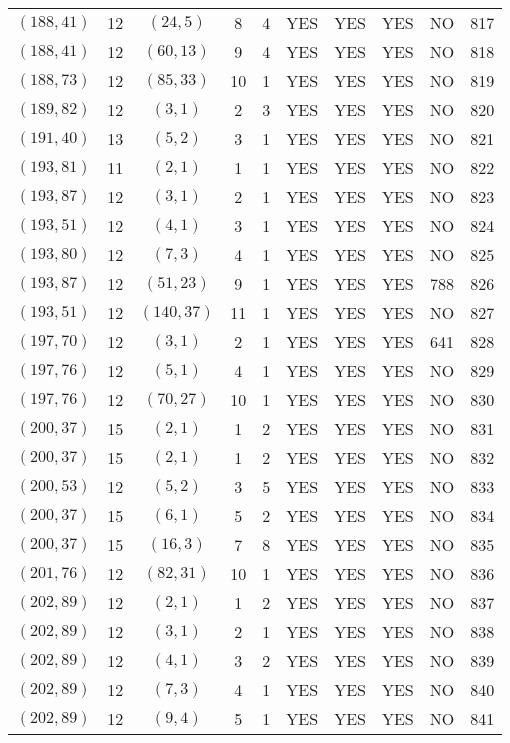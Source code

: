 \begin{longtable}{|c|c|c|c|c|c|c|c|c|c|}
$(188, 41)$ & 12 & $(24, 5)$ & 8 & 4 & YES & YES & YES & NO & 817\\
$(188, 41)$ & 12 & $(60, 13)$ & 9 & 4 & YES & YES & YES & NO & 818\\
$(188, 73)$ & 12 & $(85, 33)$ & 10 & 1 & YES & YES & YES & NO & 819\\
$(189, 82)$ & 12 & $(3, 1)$ & 2 & 3 & YES & YES & YES & NO & 820\\
$(191, 40)$ & 13 & $(5, 2)$ & 3 & 1 & YES & YES & YES & NO & 821\\
$(193, 81)$ & 11 & $(2, 1)$ & 1 & 1 & YES & YES & YES & NO & 822\\
$(193, 87)$ & 12 & $(3, 1)$ & 2 & 1 & YES & YES & YES & NO & 823\\
$(193, 51)$ & 12 & $(4, 1)$ & 3 & 1 & YES & YES & YES & NO & 824\\
$(193, 80)$ & 12 & $(7, 3)$ & 4 & 1 & YES & YES & YES & NO & 825\\
$(193, 87)$ & 12 & $(51, 23)$ & 9 & 1 & YES & YES & YES & 788 & 826\\
$(193, 51)$ & 12 & $(140, 37)$ & 11 & 1 & YES & YES & YES & NO & 827\\
$(197, 70)$ & 12 & $(3, 1)$ & 2 & 1 & YES & YES & YES & 641 & 828\\
$(197, 76)$ & 12 & $(5, 1)$ & 4 & 1 & YES & YES & YES & NO & 829\\
$(197, 76)$ & 12 & $(70, 27)$ & 10 & 1 & YES & YES & YES & NO & 830\\
$(200, 37)$ & 15 & $(2, 1)$ & 1 & 2 & YES & YES & YES & NO & 831\\
$(200, 37)$ & 15 & $(2, 1)$ & 1 & 2 & YES & YES & YES & NO & 832\\
$(200, 53)$ & 12 & $(5, 2)$ & 3 & 5 & YES & YES & YES & NO & 833\\
$(200, 37)$ & 15 & $(6, 1)$ & 5 & 2 & YES & YES & YES & NO & 834\\
$(200, 37)$ & 15 & $(16, 3)$ & 7 & 8 & YES & YES & YES & NO & 835\\
$(201, 76)$ & 12 & $(82, 31)$ & 10 & 1 & YES & YES & YES & NO & 836\\
$(202, 89)$ & 12 & $(2, 1)$ & 1 & 2 & YES & YES & YES & NO & 837\\
$(202, 89)$ & 12 & $(3, 1)$ & 2 & 1 & YES & YES & YES & NO & 838\\
$(202, 89)$ & 12 & $(4, 1)$ & 3 & 2 & YES & YES & YES & NO & 839\\
$(202, 89)$ & 12 & $(7, 3)$ & 4 & 1 & YES & YES & YES & NO & 840\\
$(202, 89)$ & 12 & $(9, 4)$ & 5 & 1 & YES & YES & YES & NO & 841\\

\end{longtable}
